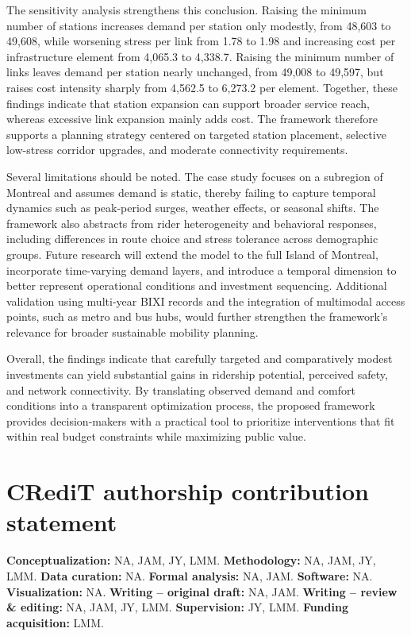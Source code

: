 \documentclass[preprint,authoryear,10pt]{elsarticle}
\begin{document}
The sensitivity analysis strengthens this conclusion. Raising the minimum number of stations increases demand per station only modestly, from 48,603 to 49,608, while worsening stress per link from 1.78 to 1.98 and increasing cost per infrastructure element from 4,065.3 to 4,338.7. Raising the minimum number of links leaves demand per station nearly unchanged, from 49,008 to 49,597, but raises cost intensity sharply from 4,562.5 to 6,273.2 per element. Together, these findings indicate that station expansion can support broader service reach, whereas excessive link expansion mainly adds cost. The framework therefore supports a planning strategy centered on targeted station placement, selective low-stress corridor upgrades, and moderate connectivity requirements.

Several limitations should be noted. The case study focuses on a subregion of Montreal and assumes demand is static, thereby failing to capture temporal dynamics such as peak-period surges, weather effects, or seasonal shifts. The framework also abstracts from rider heterogeneity and behavioral responses, including differences in route choice and stress tolerance across demographic groups. Future research will extend the model to the full Island of Montreal, incorporate time-varying demand layers, and introduce a temporal dimension to better represent operational conditions and investment sequencing. Additional validation using multi-year BIXI records and the integration of multimodal access points, such as metro and bus hubs, would further strengthen the framework’s relevance for broader sustainable mobility planning.

Overall, the findings indicate that carefully targeted and comparatively modest investments can yield substantial gains in ridership potential, perceived safety, and network connectivity. By translating observed demand and comfort conditions into a transparent optimization process, the proposed framework provides decision-makers with a practical tool to prioritize interventions that fit within real budget constraints while maximizing public value.


\section*{CRediT authorship contribution statement}
\textbf{Conceptualization:} NA, JAM, JY, LMM. 
\textbf{Methodology:} NA, JAM, JY, LMM. 
\textbf{Data curation:} NA. 
\textbf{Formal analysis:} NA, JAM. 
\textbf{Software:} NA. 
\textbf{Visualization:} NA. 
\textbf{Writing -- original draft:} NA, JAM. 
\textbf{Writing -- review \& editing:} NA, JAM, JY, LMM. 
\textbf{Supervision:} JY, LMM. 
\textbf{Funding acquisition:} LMM.
\end{document}
